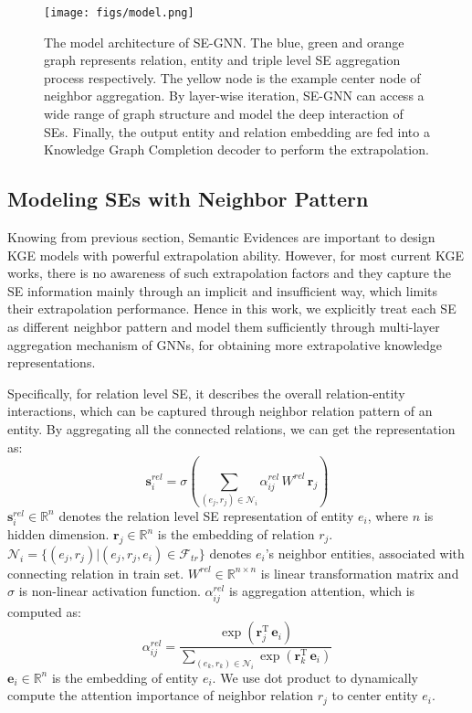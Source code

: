 \documentclass[letterpaper]{article} \usepackage{aaai22}  \usepackage{times}  \usepackage{helvet}  \usepackage{courier}  \usepackage[hyphens]{url}  \usepackage{graphicx} \urlstyle{rm} \def\UrlFont{\rm}  \usepackage{natbib}  \usepackage{caption} \DeclareCaptionStyle{ruled}{labelfont=normalfont,labelsep=colon,strut=off} \frenchspacing  \setlength{\pdfpagewidth}{8.5in}  \setlength{\pdfpageheight}{11in}  \usepackage{algorithm}
\begin{document}
\begin{figure}[t]
    \centering 
    \texttt{[image: figs/model.png]}
    \caption{The model architecture of SE-GNN. The blue, green and orange graph represents relation, entity and triple level SE aggregation process respectively. The yellow node is the example center node of neighbor aggregation. 
    By layer-wise iteration, SE-GNN can access a wide range of graph structure and model the deep interaction of SEs. 
    Finally, the output entity and relation embedding are fed into a Knowledge Graph Completion decoder to perform the extrapolation. } 
    \label{fig: model}
\end{figure}

\subsection{Modeling SEs with Neighbor Pattern}
\label{sec: modeling_se}
Knowing from previous section, Semantic Evidences are important to design KGE models with powerful extrapolation ability. 
However, for most current KGE works, there is no awareness of such extrapolation factors and they capture the SE information mainly through an implicit and insufficient way, which limits their extrapolation performance.
Hence in this work, we explicitly treat each SE as different neighbor pattern and model them sufficiently through multi-layer aggregation mechanism of GNNs, for obtaining more extrapolative knowledge representations.

Specifically, for relation level SE, it describes the overall relation-entity interactions, which can be captured through neighbor relation pattern of an entity. By aggregating all the connected relations, we can get the representation as: 
\begin{equation}
    \mathbf{s}_i^{rel} = \sigma\left( \sum_{(e_j, r_j) \in \mathcal{N}_i} \alpha^{rel}_{ij}\, W^{rel} \,\mathbf{r}_j \right)
\end{equation}
$\mathbf{s}_i^{rel} \in \mathbb{R}^n$ denotes the relation level SE representation of entity $e_i$, where $n$ is hidden dimension. $\mathbf{r}_j \in \mathbb{R}^n$ is the embedding of relation $r_j$. $\mathcal{N}_i = \{(e_j, r_j)|(e_j, r_j, e_i) \in \mathcal{F}_{tr} \}$ denotes $e_i$'s neighbor entities, associated with connecting relation in train set. $W^{rel} \in \mathbb{R}^{n \times n}$ is linear transformation matrix and $\sigma$ is non-linear activation function. $\alpha^{rel}_{ij}$ is aggregation attention, which is computed as: 
\begin{equation}
    \alpha_{ij}^{rel} = \frac{\exp \left( \mathbf{r}_j^{\mathrm{T}} \, \mathbf{e}_i \right)}{\sum_{(e_k, r_k) \in \mathcal{N}_i} \exp \left( \mathbf{r}_k^{\mathrm{T}} \, \mathbf{e}_i \right)}
\end{equation}
$\mathbf{e}_i \in \mathbb{R}^n$ is the embedding of entity $e_i$. We use dot product to dynamically compute the attention importance of neighbor relation $r_j$ to center entity $e_i$. 
\end{document}

